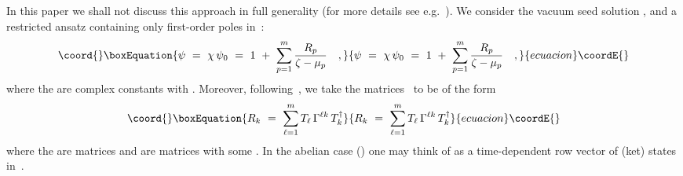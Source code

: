\documentclass[a4paper,11pt]{article}
\numberwithin{equation}{section}
\providecommand{\Hcal}{{\cal H}}
\providecommand{\Tdag}{T^{\dagger}}
\begin{document}
In this paper we shall not discuss this approach in full generality
(for more details see e.g.~\cite{zakharov,zakh2,forgacs}).
We consider the vacuum seed solution
\coordHE{}, \coordHE{} and a restricted ansatz containing only first-order
poles in~\myHighlight{$\zeta$}\coordHE{}:
\begin{equation}\coord{}\boxEquation{ \label{ansatzpsi}
\psi\ =\ \chi\,\psi_0\ =\ 1\ +\ \sum_{p=1}^m \frac{R_p}{\zeta-\mu_p} \quad,
}{ \psi\ =\ \chi\,\psi_0\ =\ 1\ +\ \sum_{p=1}^m \frac{R_p}{\zeta-\mu_p} \quad,
}{ecuacion}\coordE{}\end{equation}
where the \coordHE{} are complex constants with \coordHE{}.
Moreover, following~\cite{forgacs}, we take the matrices~\coordHE{} to be of the form
\begin{equation}\coord{}\boxEquation{ \label{ansatzR}
R_k\ =\ \sum_{\ell=1}^m T_\ell\,\Gamma^{\ell k}\,\Tdag_k
}{ R_k\ =\ \sum_{\ell=1}^m T_\ell\,\Gamma^{\ell k}\,\Tdag_k
}{ecuacion}\coordE{}\end{equation}
where the \coordHE{} are \coordHE{} matrices and \coordHE{}
are \coordHE{} matrices with some \coordHE{}.
In the abelian case (\coordHE{}) one may think of \coordHE{} as a time-dependent
row vector
\coordHE{}
of (ket) states in~\myHighlight{$\Hcal$}\coordHE{}.
\end{document}
